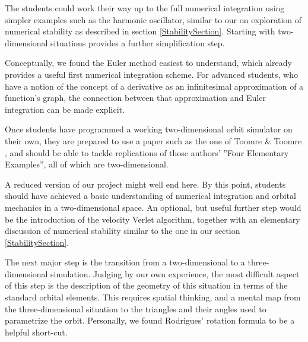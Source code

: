 \documentclass[11pt,twocolumn]{article}
\begin{document}
The students could work their way up to the full numerical integration using simpler examples such as the harmonic oscillator, similar to our on exploration of numerical stability as described in section \ref{StabilitySection}. Starting with two-dimensional situations provides a further simplification step. 

Conceptually, we found the Euler method easiest to understand, which already provides a useful first numerical integration scheme. For advanced students, who have a notion of the concept of a derivative as an infinitesimal approximation of a function's graph, the connection between that approximation and Euler integration can be made explicit.

Once students have programmed a working two-dimensional orbit simulator on their own, they are prepared to use a paper such as the one of Toomre \& Toomre \cite{toomre1972galactic}, and should be able to tackle replications of those authors' ''Four Elementary Examples'', all of which are two-dimensional.

A reduced version of our project might well end here. By this point, students should have achieved a basic understanding of numerical integration and orbital mechanics in a two-dimensional space. An optional, but useful further step would be the introduction of the velocity Verlet algorithm, together with an elementary discussion of numerical stability similar to the one in our section  \ref{StabilitySection}.

  
    
    
    
The next major step is the transition from a two-dimensional to a three-dimensional simulation. Judging by our own experience, the most difficult aspect of this step is the description of the geometry of this situation in terms of the standard orbital elements. This requires spatial thinking, and a mental map from the three-dimensional situation to the triangles and their angles used to parametrize the orbit. Personally, we found Rodrigues' rotation formula  \cite{GrayRodrigues} to be a helpful short-cut. 
   
\end{document}
